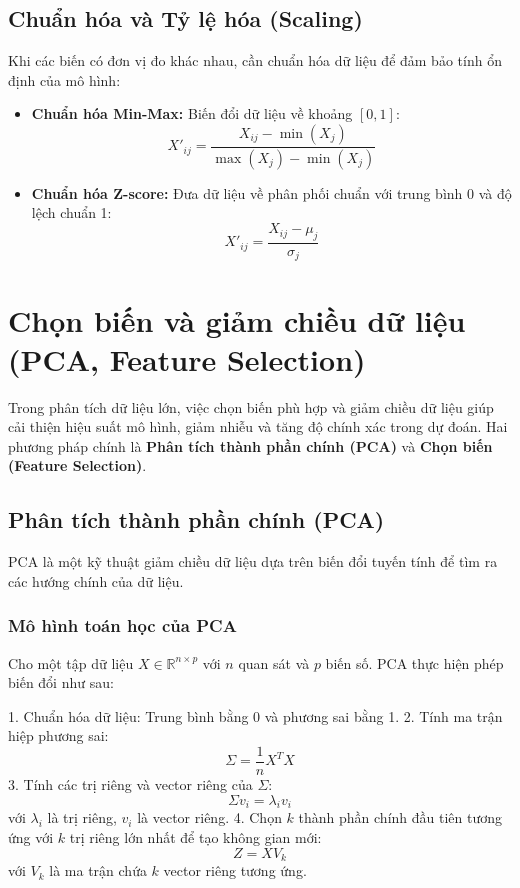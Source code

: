 \subsection{Chuẩn hóa và Tỷ lệ hóa (Scaling)}
Khi các biến có đơn vị đo khác nhau, cần chuẩn hóa dữ liệu để đảm bảo tính ổn định của mô hình:
\begin{itemize}
    \item \textbf{Chuẩn hóa Min-Max:} Biến đổi dữ liệu về khoảng $[0,1]$:
    \begin{equation}
        X'_{ij} = \frac{X_{ij} - \min(X_j)}{\max(X_j) - \min(X_j)}
    \end{equation}
    \item \textbf{Chuẩn hóa Z-score:} Đưa dữ liệu về phân phối chuẩn với trung bình 0 và độ lệch chuẩn 1:
    \begin{equation}
        X'_{ij} = \frac{X_{ij} - \mu_j}{\sigma_j}
    \end{equation}
\end{itemize}



\section{Chọn biến và giảm chiều dữ liệu (PCA, Feature Selection)}
Trong phân tích dữ liệu lớn, việc chọn biến phù hợp và giảm chiều dữ liệu giúp cải thiện hiệu suất mô hình, giảm nhiễu và tăng độ chính xác trong dự đoán. Hai phương pháp chính là \textbf{Phân tích thành phần chính (PCA)} và \textbf{Chọn biến (Feature Selection)}.

\subsection{Phân tích thành phần chính (PCA)}
PCA là một kỹ thuật giảm chiều dữ liệu dựa trên biến đổi tuyến tính để tìm ra các hướng chính của dữ liệu.

\subsubsection{Mô hình toán học của PCA}
Cho một tập dữ liệu $X \in \mathbb{R}^{n \times p}$ với $n$ quan sát và $p$ biến số. PCA thực hiện phép biến đổi như sau:

1. Chuẩn hóa dữ liệu: Trung bình bằng 0 và phương sai bằng 1.
2. Tính ma trận hiệp phương sai:
   \begin{equation}
   \Sigma = \frac{1}{n} X^T X
   \end{equation}
3. Tính các trị riêng và vector riêng của $\Sigma$:
   \begin{equation}
   \Sigma v_i = \lambda_i v_i
   \end{equation}
   với $\lambda_i$ là trị riêng, $v_i$ là vector riêng.
4. Chọn $k$ thành phần chính đầu tiên tương ứng với $k$ trị riêng lớn nhất để tạo không gian mới:
   \begin{equation}
   Z = X V_k
   \end{equation}
   với $V_k$ là ma trận chứa $k$ vector riêng tương ứng.

